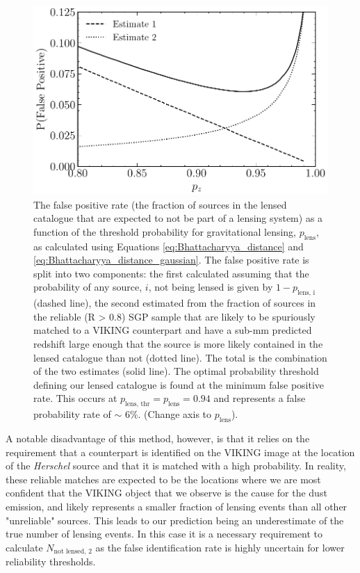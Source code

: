 \begin{figure}
    \centering
    \includegraphics[width=0.75\columnwidth]{Figures/lens_false_positive.pdf}
    \caption{The false positive rate (the fraction of sources in the lensed catalogue that are expected to not be part of a lensing system) as a function of the threshold probability for gravitational lensing, $p_\textrm{lens}$, as calculated using Equations \ref{eq:Bhattacharyya_distance} and \ref{eq:Bhattacharyya_distance_gaussian}. The false positive rate is split into two components: the first calculated assuming that the probability of any source, $i$, not being lensed is given by $1 - p_{\textrm{lens, i}}$ (dashed line), the second estimated from the fraction of sources in the reliable (R > 0.8) SGP sample that are likely to be spuriously matched to a VIKING counterpart and have a sub-mm predicted redshift large enough that the source is more likely contained in the lensed catalogue than not (dotted line). The total is the combination of the two estimates (solid line). The optimal probability threshold defining our lensed catalogue is found at the minimum false positive rate. This occurs at $p_\textrm{lens, thr} = p_\textrm{lens} = 0.94$ and represents a false probability rate of $\sim$ 6\%. {\color{red} (Change axis to $p_\textrm{lens}$).}}
    \label{fig:lens_false_positive}
\end{figure}

A notable disadvantage of this method, however, is that it relies on the requirement that a counterpart is identified on the VIKING image at the location of the \textit{Herschel} source and that it is matched with a high probability. In reality, these reliable matches are expected to be the locations where we are most confident that the VIKING object that we observe is the cause for the dust emission, and likely represents a smaller fraction of lensing events than all other "unreliable" sources. This leads to our prediction being an underestimate of the true number of lensing events. In this case it is a necessary requirement to calculate $N_{\textrm{not lensed, 2}}$ as the false identification rate is highly uncertain for lower reliability thresholds.

